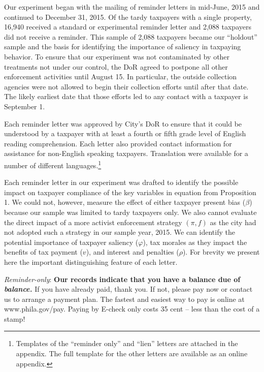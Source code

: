 Our experiment began with the mailing of reminder
letters in mid-June, 2015 and continued to December 31, 2015.  Of the
tardy taxpayers with a single property, 16,940 received a standard or experimental
reminder letter and 2,088 taxpayers did not receive a
reminder.  This sample of 2,088 taxpayers became our ``holdout''
sample and the basis for identifying the importance of saliency in
taxpaying behavior. To ensure that our experiment was not contaminated
by other treatments not under our control, the DoR agreed to postpone
all other enforcement activities until August 15.  In particular, the
outside collection agencies were not allowed to begin their collection
efforts until after that date.  The likely earliest date that those
efforts led to any contact with a taxpayer is September 1.

Each reminder letter was
approved by City's DoR to ensure that it could be understood by a
taxpayer with at least a fourth or fifth grade level of English
reading comprehension.  Each letter also provided contact information
for assistance for non-English speaking taxpayers.  Translation were
available for a number of different languages.\footnote{Templates of the 
``reminder only'' and ``lien'' letters  are attached in the  appendix. 
The full  template for the other letters are available as an online appendix.} 

Each reminder letter in our experiment was drafted to identify the
possible impact on taxpayer compliance of the key variables in
equation from Proposition 1.  We could not, however, measure the effect of
either taxpayer present bias ($\beta$) because our sample was limited
to tardy taxpayers only. We also cannot evaluate the direct
impact of a more activist enforcement strategy $(\pi, f)$ as the city
had not adopted such a strategy in our sample year, 2015. We can identify the potential importance of taxpayer saliency
($\varphi$), tax morales as they impact the benefits of tax payment
($v$), and interest and penalties ($\rho$). 
 For
brevity we present here the important distinguishing feature of each
letter.

\bigskip

\noindent \textit{Reminder-only}: \textbf{Our records indicate 
that you have a balance due of \textit{balance. }} If you have 
already paid, thank you.  If not, please pay now or contact us 
to arrange a payment plan.  The fastest and easiest way to pay is 
online at  www.phila.gov/pay. Paying by E-check only costs 35 cent 
-- less than the cost of a stamp!

